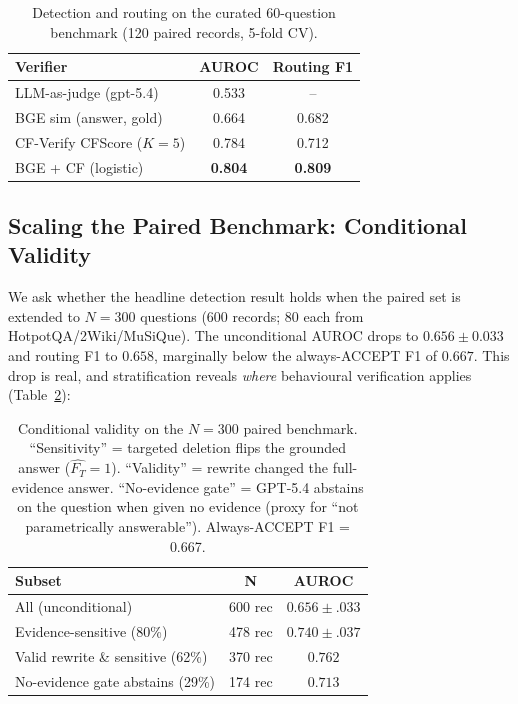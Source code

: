 \documentclass[11pt]{article}
\begin{document}
\begin{table}[t]
\centering
\small
\caption{Detection and routing on the curated 60-question benchmark (120 paired records, 5-fold CV).}
\label{tab:detection_all}
\begin{tabular}{@{}lcc@{}}
\toprule
Verifier & AUROC & Routing F1 \\
\midrule
LLM-as-judge (gpt-5.4) & 0.533 & -- \\
BGE sim (answer, gold)  & 0.664 & 0.682 \\
CF-Verify CFScore ($K{=}5$) & 0.784 & 0.712 \\
BGE + CF (logistic) & \textbf{0.804} & \textbf{0.809} \\
\bottomrule
\end{tabular}
\end{table}

\subsection{Scaling the Paired Benchmark: Conditional Validity}
\label{sec:conditional}
We ask whether the headline detection result holds when the paired set is extended to $N{=}300$ questions (600 records; 80 each from HotpotQA/2Wiki/MuSiQue). The unconditional AUROC drops to $0.656 \pm 0.033$ and routing F1 to $0.658$, marginally below the always-ACCEPT F1 of $0.667$. This drop is real, and stratification reveals \emph{where} behavioural verification applies (Table~\ref{tab:conditional}):

\begin{table}[t]
\centering
\small
\caption{Conditional validity on the $N{=}300$ paired benchmark. ``Sensitivity'' = targeted deletion flips the grounded answer ($\widehat{F_T}{=}1$). ``Validity'' = rewrite changed the full-evidence answer. ``No-evidence gate'' = GPT-5.4 abstains on the question when given no evidence (proxy for ``not parametrically answerable''). Always-ACCEPT F1 = 0.667.}
\label{tab:conditional}
\begin{tabular}{@{}lcc@{}}
\toprule
Subset & N & AUROC \\
\midrule
All (unconditional)            & 600 rec & $0.656{\pm}.033$ \\
Evidence-sensitive (80\%)      & 478 rec & $0.740{\pm}.037$ \\
Valid rewrite \& sensitive (62\%) & 370 rec & $\mathbf{0.762}$ \\
\midrule
No-evidence gate abstains (29\%) & 174 rec & $0.713$ \\
\bottomrule
\end{tabular}
\end{table}
\end{document}
